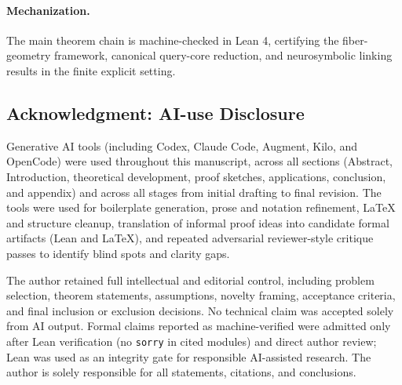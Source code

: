 \paragraph{Mechanization.}
The main theorem chain is machine-checked in Lean 4, certifying the fiber-geometry framework, canonical query-core reduction, and neurosymbolic linking results in the finite explicit setting.

\subsection*{Acknowledgment: AI-use Disclosure}

Generative AI tools (including Codex, Claude Code, Augment, Kilo, and OpenCode) were used throughout this manuscript, across all sections (Abstract, Introduction, theoretical development, proof sketches, applications, conclusion, and appendix) and across all stages from initial drafting to final revision. The tools were used for boilerplate generation, prose and notation refinement, LaTeX and structure cleanup, translation of informal proof ideas into candidate formal artifacts (Lean and LaTeX), and repeated adversarial reviewer-style critique passes to identify blind spots and clarity gaps.

The author retained full intellectual and editorial control, including problem selection, theorem statements, assumptions, novelty framing, acceptance criteria, and final inclusion or exclusion decisions. No technical claim was accepted solely from AI output. Formal claims reported as machine-verified were admitted only after Lean verification (no \texttt{sorry} in cited modules) and direct author review; Lean was used as an integrity gate for responsible AI-assisted research. The author is solely responsible for all statements, citations, and conclusions.
